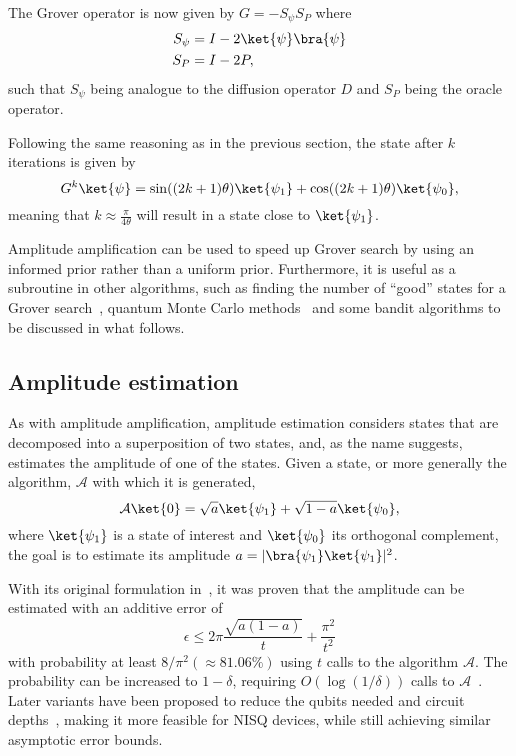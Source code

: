 The Grover operator is now given by $G=-S_\psi S_P$ where
\begin{align}
    S_\psi & = I - 2\ket{\psi}\bra{\psi} \\
    S_P    & = I - 2P,
\end{align}
such that $S_\psi$ being analogue to the diffusion operator $D$ and $S_P$ being the oracle operator.

Following the same reasoning as in the previous section, the state after $k$ iterations is given by
\begin{equation}
    G^k \ket{\psi} = \sin((2k+1)\theta)\ket{\psi_1} + \cos((2k+1)\theta)\ket{\psi_0},
\end{equation}
meaning that $k \approx \frac{\pi}{4\theta}$ will result in a state close to $\ket{\psi_1}$.

Amplitude amplification can be used to speed up Grover search by using an informed prior rather than a uniform prior.
Furthermore, it is useful as a subroutine in other algorithms, such as finding the number of \enquote{good} states for a Grover search~\autocite{brassard2002}, quantum Monte Carlo methods~\autocite{montanaro2015} and some bandit algorithms to be discussed in what follows.

\subsection{Amplitude estimation}
\label{sec:amplitude-estimation}
As with amplitude amplification, amplitude estimation considers states that are decomposed into a superposition of two states, and, as the name suggests, estimates the amplitude of one of the states.
Given a state, or more generally the algorithm, $\mathcal{A}$ with which it is generated,
\begin{equation}
    \mathcal{A} \ket{0} = \sqrt{a} \ket{\psi_1} + \sqrt{1-a} \ket{\psi_0},
\end{equation}
where $\ket{\psi_1}$ is a state of interest and $\ket{\psi_0}$ its orthogonal complement, the goal is to estimate its amplitude $a = \lvert\bra{\psi_1}\ket{\psi_1}\rvert^2$.

With its original formulation in~\autocite{brassard2002}, it was proven that the amplitude can be estimated with an additive error of
\begin{equation}
    \epsilon \leq 2\pi \frac{\sqrt{a(1-a)}}{t} +\frac{\pi^2}{t^2}
\end{equation}
with probability at least $8/\pi^2(\approx 81.06\%)$ using $t$ calls to the algorithm $\mathcal{A}$.
The probability can be increased to $1-\delta$, requiring $O(\log(1/\delta))$ calls to $\mathcal{A}$~\autocite{montanaro2015}.
Later variants have been proposed to reduce the qubits needed and circuit depths~\autocite{suzuki2020, nakaji2020, grinko2021}, making it more feasible for NISQ devices, while still achieving similar asymptotic error bounds.


